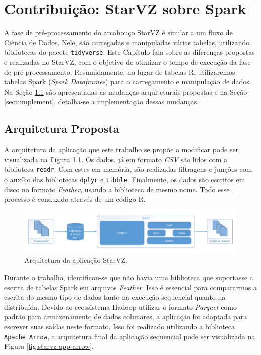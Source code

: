 \chapter{Contribuição: StarVZ sobre Spark} \label{ch:contribution}

A fase de pré-processamento do arcabouço StarVZ é similar a um fluxo de Ciência 
de Dados. Nele, são carregadas e manipuladas várias tabelas, utilizando 
bibliotecas do pacote \texttt{tidyverse}. Este Capítulo fala sobre as diferenças 
propostas e realizadas no StarVZ, com o objetivo de otimizar o tempo de 
execução da fase de pré-processamento. Resumidamente, no lugar de tabelas R, 
utilizaremos tabelas Spark (\emph{Spark Dataframes}) para o carregamento e 
manipulação de dados. Na Seção \ref{sect:arch} são apresentadas as mudanças 
arquiteturais propostas e na Seção \ref{sect:implement}, detalha-se a 
implementação dessas mudanças.

\section{Arquitetura Proposta} \label{sect:arch}

A arquitetura da aplicação que este trabalho se propõe a modificar pode ser 
visualizada na Figura \ref{fig:starvz-app}. Os dados, já em formato 
\textit{CSV} são lidos com a biblioteca \texttt{readr}. Com estes em memória, 
são realizadas filtragens e junções com o auxílio das bibliotecas \texttt{dplyr} 
e \texttt{tibble}. Finalmente, os dados são escritos em disco no formato 
\textit{Feather}, usando a biblioteca de mesmo nome. Todo esse processo é 
conduzido através de um código R.

\begin{figure}[ht]
 \centerline{\includegraphics[width=1\textwidth]{./img/starvz-arch.pdf}}
 \caption{Arquitetura da aplicação StarVZ.}
 \label{fig:starvz-app}
\end{figure}

Durante o trabalho, identificou-se que não havia uma biblioteca que suportasse a 
escrita de tabelas Spark em arquivos \textit{Feather}. Isso é essencial para 
compararmos a escrita do mesmo tipo de dados tanto na execução sequencial quanto 
na distribuída. Devido ao ecossistema Hadoop utilizar 
o formato \textit{Parquet} \cite{ref:parquet} como padrão para armazenamento de 
dados colunares, a aplicação foi adaptada para escrever suas saídas neste 
formato. Isso foi realizado utilizando a biblioteca \texttt{Apache Arrow}, a 
arquitetura final da aplicação sequencial pode ser visualizada na Figura 
\ref{fig:starvz-app-arrow}. 

